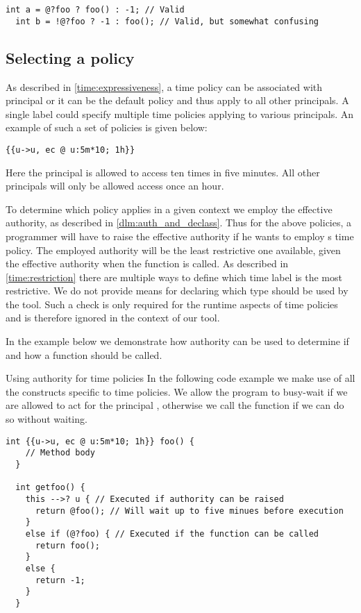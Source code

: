 \begin{lstlisting}[style=dlmc]
  int a = @?foo ? foo() : -1; // Valid
  int b = !@?foo ? -1 : foo(); // Valid, but somewhat confusing
\end{lstlisting}

\subsection{Selecting a policy}\label{time:authority}
As described in \cref{time:expressiveness}, a time policy can be associated with principal or it can be the default policy and thus apply to all other principals.
A single label could specify multiple time policies applying to various principals.
An example of such a set of policies is given below:
\begin{lstlisting}[style=dlmc]
  {{u->u, ec @ u:5m*10; 1h}}
\end{lstlisting}
Here the principal  is allowed to access ten times in five minutes.
All other principals will only be allowed access once an hour.

To determine which policy applies in a given context we employ the effective authority, as described in \cref{dlm:auth_and_declass}.
Thus for the above policies, a programmer will have to raise the effective authority if he wants to employ s time policy.
The employed authority will be the least restrictive one available, given the effective authority when the function is called.
As described in \cref{time:restriction} there are multiple ways to define which time label is the most restrictive.
We do not provide means for declaring which type should be used by the tool.
Such a check is only required for the runtime aspects of time policies and is therefore ignored in the context of our tool.

In the example below we demonstrate how authority can be used to determine if and how a function should be called.

\begin{minipage}{\linewidth}
\begin{example}{Using authority for time policies}
In the following code example we make use of all the constructs specific to time policies.
We allow the program to busy-wait if we are allowed to act for the principal , otherwise we call the function  if we can do so without waiting.
\begin{lstlisting}[style=dlmc]
  int {{u->u, ec @ u:5m*10; 1h}} foo() {
    // Method body
  }
  
  int getfoo() {
    this -->? u { // Executed if authority can be raised
      return @foo(); // Will wait up to five minues before execution
    }
    else if (@?foo) { // Executed if the function can be called
      return foo();
    }
    else {
      return -1;
    }
  }
\end{lstlisting}
\end{example}
\end{minipage}

